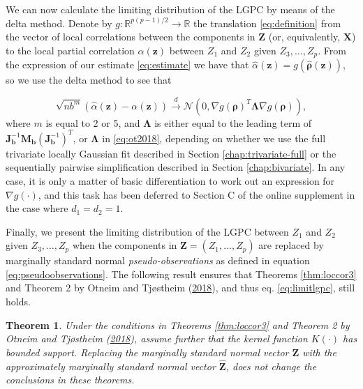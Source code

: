 \documentclass[
  12pt,
  letterpaper]{article}
\newcommand{\X}{\bm{X}}
\newcommand{\Z}{\bm{Z}}
\newcommand{\z}{\bm{z}}
\newcommand{\hZ}{\widehat{\bm{Z}}}
\newcommand{\frho}{\bm{\rho}}
\newcommand{\hfrho}{\widehat{\bm{\rho}}}
\newcommand{\hh}{\bm{b}}
\newcommand{\halpha}{\widehat{\alpha}}
\newcommand{\fLambda}{\bm{\Lambda}}
\newcommand{\Jb}{\bm{J}_{\hh}}
\newcommand{\Mb}{\bm{M}_{\hh}}
\newtheorem{theorem}{Theorem}[section]
\theoremstyle{definition}
\theoremstyle{definition}
\theoremstyle{definition}
\theoremstyle{remark}
\begin{document}
We can now calculate the limiting distribution of the LGPC by means of the delta method. Denote by \(g: \mathbb{R}^{p(p-1)/2} \rightarrow \mathbb{R}\) the translation \eqref{eq:definition} from the vector of local correlations between the components in \(\Z\) (or, equivalently, \(\X\)) to the local partial correlation \(\alpha(\z)\) between \(Z_1\) and \(Z_2\) given \(Z_3, \ldots, Z_p\). From the expression of our estimate \eqref{eq:estimate} we have that \(\halpha(\z) = g(\hfrho(\z))\), so we use the delta method to see that

\begin{equation}
\sqrt{nb^m}\left(\halpha(\z) - \alpha(\z)\right) \stackrel{d}{\rightarrow} \mathcal{N}\left(0, \nabla g(\frho)^T\fLambda\nabla g(\frho)\right),
\label{eq:limitlgpc}
\end{equation}
where \(m\) is equal to 2 or 5, and \(\fLambda\) is either equal to the leading term of \(\Jb^{-1}\Mb(\Jb^{-1})^T\), or \(\fLambda\) in \eqref{eq:ot2018}, depending on whether we use the full trivariate locally Gaussian fit described in Section \ref{chap:trivariate-full} or the sequentially pairwise simplification described in Section \ref{chap:bivariate}. In any case, it is only a matter of basic differentiation to work out an expression for \(\nabla g(\cdot)\), and this task has been deferred to Section C of the online supplement in the case where \(d_1 = d_2 = 1\).

Finally, we present the limiting distribution of the LGPC between \(Z_1\) and \(Z_2\) given \(Z_3, \ldots, Z_p\) when the components in \(\Z = (Z_1, \ldots, Z_p)\) are replaced by marginally standard normal \emph{pseudo-observations} as defined in equation \eqref{eq:pseudoobservations}. The following result ensures that Theorems \ref{thm:loccor3} and Theorem 2 by Otneim and Tjøstheim (\protect\hyperlink{ref-otneim2017conditional}{2018}), and thus eq. \eqref{eq:limitlgpc}, still holds.

\vspace{.5cm}

\begin{theorem}
\protect\hypertarget{thm:pseudo}{}{\label{thm:pseudo} }Under the conditions in Theorems \ref{thm:loccor3} and Theorem 2 by Otneim and Tjøstheim (\protect\hyperlink{ref-otneim2017conditional}{2018}), assume further that the kernel function \(K(\cdot)\) has bounded support. Replacing the marginally standard normal vector \(\Z\) with the approximately marginally standard normal vector \(\hZ\), does not change the conclusions in these theorems.
\end{theorem}
\end{document}
